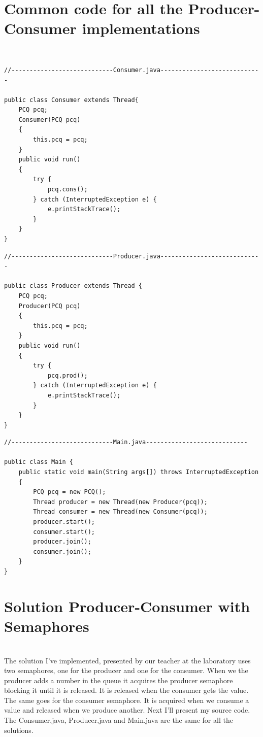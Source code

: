 \documentclass[14pt]{article}
\begin{document}
\section*{Common code for all the Producer-Consumer implementations}\\
\begin{lstlisting}
//----------------------------Consumer.java----------------------------

public class Consumer extends Thread{
	PCQ pcq;
	Consumer(PCQ pcq)
	{
		this.pcq = pcq;
	}
	public void run()
	{
		try {
			pcq.cons();
		} catch (InterruptedException e) {
			e.printStackTrace();
		}
	}
}
\end{lstlisting}
\begin{lstlisting}
//----------------------------Producer.java----------------------------

public class Producer extends Thread {
	PCQ pcq;
	Producer(PCQ pcq)
	{
		this.pcq = pcq;
	}
	public void run()
	{
		try {
			pcq.prod();
		} catch (InterruptedException e) {
			e.printStackTrace();
		}
	}
}

\end{lstlisting}
\begin{lstlisting}
//----------------------------Main.java----------------------------

public class Main {
	public static void main(String args[]) throws InterruptedException
	{
		PCQ pcq = new PCQ();
	    Thread producer = new Thread(new Producer(pcq));
	    Thread consumer = new Thread(new Consumer(pcq));
	    producer.start();
	    consumer.start();
	    producer.join();
	    consumer.join();   
	}
}

\end{lstlisting}

\section*{Solution Producer-Consumer with Semaphores}\\
The solution I've implemented, presented by our teacher at the laboratory uses two semaphores, one for the producer and one for the consumer. When we the producer adds a number in the queue it acquires the producer semaphore blocking it until it is released. It is released when the consumer gets the value. The same goes for the consumer semaphore. It is acquired when we consume a value and released when we produce another.
Next I'll present my source code. The Consumer.java, Producer.java and Main.java are the same for all the solutions.
\end{document}
